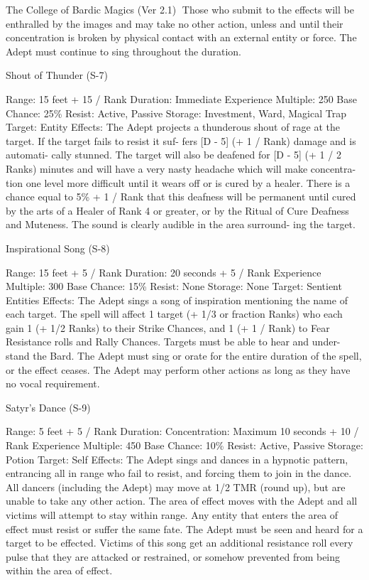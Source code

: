 \begin{Chapter}{The College of Bardic Magics (Ver 2.1)}
Those  who submit to the effects will be enthralled 
by the images and may take no other action, unless 
and until their concentration is broken by physical 
contact with an external entity or force. The Adept 
must continue to sing throughout the duration. 

Shout of Thunder (S-7) 

Range: 15 feet + 15 / Rank 
Duration: Immediate 
Experience Multiple: 250 
Base Chance: 25\% 
Resist: Active, Passive 
Storage: Investment, Ward, Magical Trap 
Target: Entity 
Effects:  The  Adept  projects  a  thunderous  shout  of 
rage at the target. If the target fails to resist it suf-
fers  [D  -  5]  (+  1 / Rank) damage  and  is automati-
cally stunned. The target will also be deafened for 
[D  -  5]  (+  1  /  2  Ranks)  minutes  and  will  have  a 
very  nasty  headache  which  will  make  concentra-
tion one level more difficult until it wears off or is 
cured by a healer. There is a chance equal to 5\% + 
1 / Rank that this deafness will be permanent until 
cured by the arts of a Healer of Rank 4 or greater, 
or  by  the  Ritual  of  Cure  Deafness  and  Muteness. 
The  sound  is  clearly  audible  in  the  area  surround-
ing the target. 

Inspirational Song (S-8) 

Range: 15 feet + 5 / Rank 
Duration: 20 seconds + 5 / Rank 
Experience Multiple: 300 
Base Chance: 15\% 
Resist: None 
Storage: None 
Target: Sentient Entities 
Effects:  The  Adept  sings  a  song  of  inspiration 
mentioning the name of each target. The spell will 
affect  1  target  (+  1/3  or  fraction  Ranks)  who  each 
gain 1 (+ 1/2 Ranks) to their Strike Chances, and 1 
(+  1  /  Rank)  to  Fear  Resistance  rolls  and  Rally 
Chances.  Targets  must  be  able  to  hear  and  under-
stand  the  Bard.  The  Adept  must  sing  or  orate  for 
the entire duration of the spell, or the effect ceases. 
The  Adept  may  perform  other  actions  as  long  as 
they have no vocal requirement. 

Satyr’s Dance (S-9) 

Range: 5 feet + 5 / Rank 
Duration:  Concentration:  Maximum  10  seconds  + 
10 / Rank 
Experience Multiple: 450 
Base Chance: 10\% 
Resist: Active, Passive 
Storage: Potion 
Target: Self 
Effects: The  Adept sings and dances in a hypnotic 
pattern,  entrancing  all  in  range  who  fail  to  resist, 
and  forcing  them to  join  in the  dance.  All  dancers 
(including  the  Adept)  may  move  at  1/2  TMR 
(round up), but are unable to take any other action. 
The  area  of  effect  moves  with  the  Adept  and  all 
victims  will  attempt  to  stay  within  range.  Any 
entity  that  enters  the  area  of  effect  must  resist  or 
suffer  the  same  fate.  The  Adept  must  be  seen  and 
heard  for  a  target  to  be  effected.  Victims  of  this 
song  get  an  additional  resistance  roll  every  pulse 
that  they  are  attacked  or  restrained,  or  somehow 
prevented from being within the area of effect. 


\end{Chapter}
